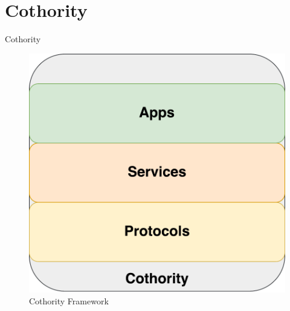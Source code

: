 \documentclass{beamer}
\begin{document}
\begin{frame}

\end{frame}

\section{Cothority}
\begin{frame}{Cothority}

\begin{figure}[h]
\includegraphics[scale=.5]{graphic/cothority.pdf}
\centering
\caption*{Cothority Framework}
\end{figure}

\end{frame}
\end{document}
